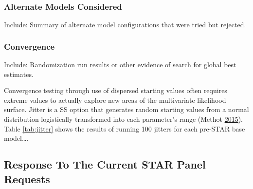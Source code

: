 \documentclass[12pt,]{article}
\begin{document}
\subsubsection{Alternate Models
Considered}\label{alternate-models-considered}

Include: Summary of alternate model configurations that were tried but
rejected.

\subsubsection{Convergence}\label{convergence}

Include: Randomization run results or other evidence of search for
global best estimates.

Convergence testing through use of dispersed starting values often
requires extreme values to actually explore new areas of the
multivariate likelihood surface. Jitter is a SS option that generates
random starting values from a normal distribution logistically
transformed into each parameter's range (Methot
\protect\hyperlink{ref-Methot2015}{2015}). Table \ref{tab:jitter} shows
the results of running 100 jitters for each pre-STAR base model\ldots{}.

\subsection{Response To The Current STAR Panel
Requests}\label{response-to-the-current-star-panel-requests}
\end{document}
